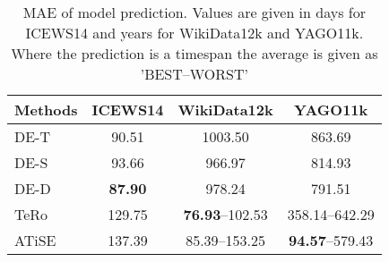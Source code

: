\begin{table}[htb]
\centering
\begin{minipage}{0.95\columnwidth}
\centering
\caption{MAE of model prediction. Values are given in days for ICEWS14 and years for WikiData12k and YAGO11k. Where the prediction is a timespan the average is given as '\textsc{BEST}–\textsc{WORST}'}
\vspace{-3mm}

\begin{tabular}{lccc}
\hline
Methods & ICEWS14 & WikiData12k & YAGO11k\\
\hline
DE-T & 90.51 & 1003.50 & 863.69\\
DE-S & 93.66 & 966.97 & 814.93\\
DE-D & \textbf{87.90} & 978.24 & 791.51\\
TeRo & 129.75 & \textbf{76.93}–102.53 & 358.14–642.29\\
ATiSE & 137.39 & 85.39–153.25 & \textbf{94.57}–579.43\\
\hline

\end{tabular}

\label{tab:temporal_precision_mae}
\end{minipage}
\end{table}